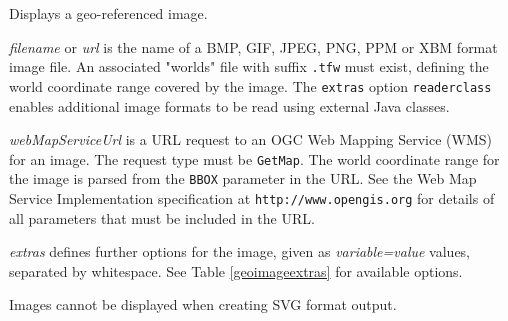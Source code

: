 Displays a geo-referenced image.

\textit{filename} or
\textit{url}
is the name of a BMP, GIF, JPEG, PNG, PPM or XBM format image file.
An associated "worlds" file with suffix \texttt{.tfw} must exist,
defining the world coordinate range covered by the image.
The \texttt{extras} option \texttt{readerclass} enables additional
image formats to be read using external Java classes.

\textit{webMapServiceUrl} is a URL request to an
OGC Web Mapping Service (WMS)
for an image.  The request type must be \texttt{GetMap}.
The world coordinate range for the image is parsed from the
\texttt{BBOX} parameter in the URL.
See the Web Map Service Implementation specification at
\texttt{http://www.opengis.org}
for details of all parameters that must be included in the URL.

\textit{extras} defines further options for the image, given as
\textit{variable=value} values, separated by whitespace.
See Table \ref{geoimageextras}
for available options.

Images cannot be displayed when creating SVG format output.

